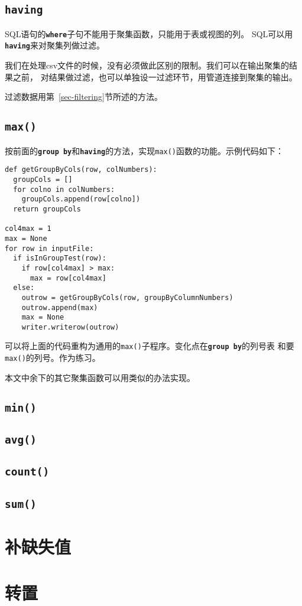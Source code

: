 \documentclass[11pt]{article}
\newcommand{\id}[1]{\texttt{#1}}
\newcommand{\kw}[1]{\texttt{\textbf{#1}}}
\begin{document}
\subsection{\kw{having}}
SQL语句的\kw{where}子句不能用于聚集函数，只能用于表或视图的列。
SQL可以用\kw{having}来对聚集列做过滤。

我们在处理csv文件的时候，没有必须做此区别的限制。我们可以在输出聚集的结果之前，
对结果做过滤，也可以单独设一过滤环节，用管道连接到聚集的输出。

过滤数据用第~\ref{sec-filtering}节所述的方法。

\subsection{\id{max()}}
按前面的\kw{group by}和\kw{having}的方法，实现\id{max()}函数的功能。示例代码如下：
\begin{lstlisting}
def getGroupByCols(row, colNumbers):
  groupCols = []
  for colno in colNumbers:
    groupCols.append(row[colno])
  return groupCols

col4max = 1
max = None
for row in inputFile:
  if isInGroupTest(row):
    if row[col4max] > max:
      max = row[col4max]
  else:
    outrow = getGroupByCols(row, groupByColumnNumbers)
    outrow.append(max)
    max = None
    writer.writerow(outrow)
\end{lstlisting}

可以将上面的代码重构为通用的\id{max()}子程序。变化点在\kw{group by}的列号表
和要\id{max()}的列号。作为练习。 

本文中余下的其它聚集函数可以用类似的办法实现。
\subsection{\id{min()}}
\subsection{\id{avg()}}
\subsection{\id{count()}}
\subsection{\id{sum()}}

\section{补缺失值}

\section{转置}
\end{document}
